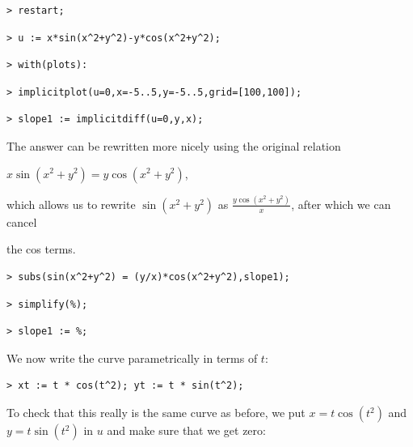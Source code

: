 \documentclass{article}
\begin{document}
\begin{lstlisting}
> restart;
\end{lstlisting}
\begin{lstlisting}
> u := x*sin(x^2+y^2)-y*cos(x^2+y^2);
\end{lstlisting}
\begin{lstlisting}
> with(plots):
\end{lstlisting}
\begin{lstlisting}
> implicitplot(u=0,x=-5..5,y=-5..5,grid=[100,100]);
\end{lstlisting}
\begin{lstlisting}
> slope1 := implicitdiff(u=0,y,x);
\end{lstlisting}
\begin{Maple Normal}
The answer can be rewritten more nicely using the original relation
\end{Maple Normal}
\begin{center}
 
$x \sin (x^{2}+y^{2})=y \cos (x^{2}+y^{2})$, \end{center}
\begin{Maple Normal}

\end{Maple Normal}
\begin{Maple Normal}
which allows us to rewrite 
$\sin (x^{2}+y^{2})$ as 
$\frac{y \cos (x^{2}+y^{2})}{x}$, after which we can cancel 
\end{Maple Normal}
\begin{Maple Normal}
the cos terms.
\end{Maple Normal}
\begin{lstlisting}
> subs(sin(x^2+y^2) = (y/x)*cos(x^2+y^2),slope1);
\end{lstlisting}
\begin{lstlisting}
> simplify(%);
\end{lstlisting}
\begin{lstlisting}
> slope1 := %;
\end{lstlisting}
\begin{Maple Normal}

\end{Maple Normal}
\begin{Maple Normal}
We now write the curve parametrically in terms of 
$t$:
\end{Maple Normal}
\begin{lstlisting}
> xt := t * cos(t^2); yt := t * sin(t^2);
\end{lstlisting}
\begin{Maple Normal}
To check that this really is the same curve as before, we put 
$x =t \cos (t^{2})$ and 
$y =t \sin (t^{2})$ in 
$u$ and make sure that we get zero:
\end{Maple Normal}
\end{document}
